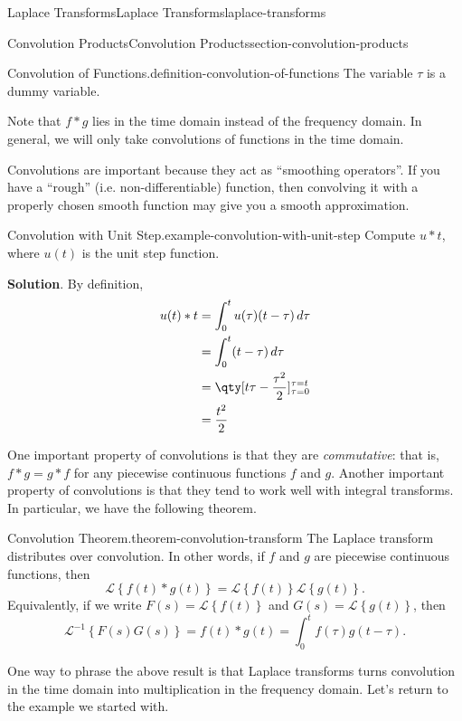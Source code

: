 \documentclass[oneside,10pt,]{book}
\numberwithin{equation}{section}
\newcommand{\Int}[2]{\int_{#1}^{#2}}
\newcommand{\Laplace}[1]{\mathcal{L}\left\{#1\right\}}
\newcommand{\iLaplace}[1]{\mathcal{L}^{-1}\left\{#1\right\}}
\newcommand{\amp}{&}
\begin{document}
\begin{chapterptx}{Laplace Transforms}{}{Laplace Transforms}{}{}{laplace-transforms}
\begin{sectionptx}{Convolution Products}{}{Convolution Products}{}{}{section-convolution-products}
\begin{definition}{Convolution of Functions.}{definition-convolution-of-functions}
The variable \(\tau\) is a dummy variable.%
\end{definition}
\hypertarget{p-555}{}%
Note that \(f\ast g\) lies in the time domain instead of the frequency domain. In general, we will only take convolutions of functions in the time domain.%
\par
\hypertarget{p-556}{}%
Convolutions are important because they act as ``smoothing operators''. If you have a ``rough'' (i.e. non-differentiable) function, then convolving it with a properly chosen smooth function may give you a smooth approximation.%
\begin{example}{Convolution with Unit Step.}{example-convolution-with-unit-step}%
\hypertarget{p-557}{}%
Compute \(u\ast t\), where \(u(t)\) is the unit step function.%
\par\smallskip%
\noindent\textbf{Solution}.\hypertarget{solution-90}{}\quad%
\hypertarget{p-558}{}%
By definition,%
\begin{align*}
u(t)\ast t \amp= \Int{0}{t}u(\tau)(t-\tau)\,d\tau \\
\amp= \Int{0}{t}(t-\tau)\,d\tau \\
\amp= \qty[t\tau-\frac{\tau^{2}}{2}]_{\tau=0}^{\tau=t} \\
\amp= \frac{t^{2}}{2}
\end{align*}
%
\end{example}
\hypertarget{p-559}{}%
One important property of convolutions is that they are \emph{commutative}: that is, \(f\ast g = g\ast f\) for any piecewise continuous functions \(f\) and \(g\). Another important property of convolutions is that they tend to work well with integral transforms. In particular, we have the following theorem.%
\begin{theorem}{Convolution Theorem.}{}{theorem-convolution-transform}%
\hypertarget{p-560}{}%
The Laplace transform distributes over convolution. In other words, if \(f\) and \(g\) are piecewise continuous functions, then%
\begin{equation*}
\Laplace{f(t)\ast g(t)} = \Laplace{f(t)}\Laplace{g(t)}.
\end{equation*}
Equivalently, if we write \(F(s) = \Laplace{f(t)}\) and \(G(s) = \Laplace{g(t)}\), then%
\begin{equation*}
\iLaplace{F(s)G(s)} = f(t)\ast g(t) = \Int{0}{t}f(\tau)g(t-\tau).
\end{equation*}
%
\end{theorem}
\hypertarget{p-561}{}%
One way to phrase the above result is that Laplace transforms turns convolution in the time domain into multiplication in the frequency domain. Let's return to the example we started with.%

\end{sectionptx}
\end{chapterptx}
\end{document}
